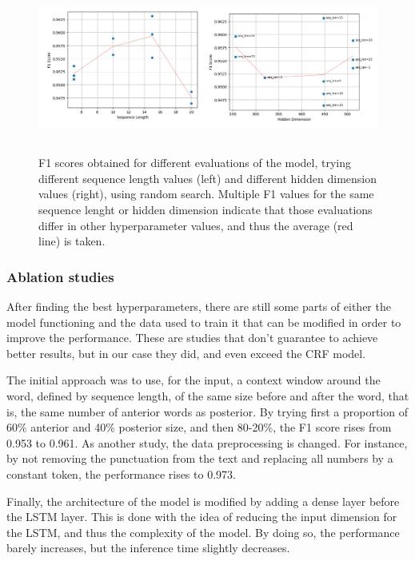 \documentclass{article}
\begin{document}
\begin{figure}[!t]
	\centering
	\includegraphics[height=5.6cm]{images/lstm_analysis.jpg}
	\captionsetup{width=0.9\textwidth}
	\caption{F1 scores obtained for different evaluations of the model, trying different sequence length values (left)
	and different hidden dimension values (right), using random search. Multiple F1 values for the same sequence lenght
	or hidden dimension indicate that those evaluations differ in other hyperparameter values, and thus the
	average (red line) is taken.}
	\label{fig:lstm_analysis}
\end{figure}

\subsubsection*{Ablation studies}
After finding the best hyperparameters, there are still some parts of either the model functioning and the data used
to train it that can be modified in order to improve the performance. These are studies that don’t guarantee to
achieve better results, but in our case they did, and even exceed the CRF model.

The initial approach was to use, for the input, a context window around the word, defined by sequence length,
of the same size before and after the word, that is, the same number of anterior words as posterior. By trying first
a proportion of 60\% anterior and 40\% posterior size, and then 80-20\%, the F1 score rises from 0.953 to 0.961.
As another study, the data preprocessing is changed. For instance, by not removing the punctuation from the text and
replacing all numbers by a constant token, the performance rises to 0.973.

Finally, the architecture of the model is modified by adding a dense layer before the LSTM layer. This is done with
the idea of reducing the input dimension for the LSTM, and thus the complexity of the model. By doing so, the performance
barely increases, but the inference time slightly decreases.
\end{document}
